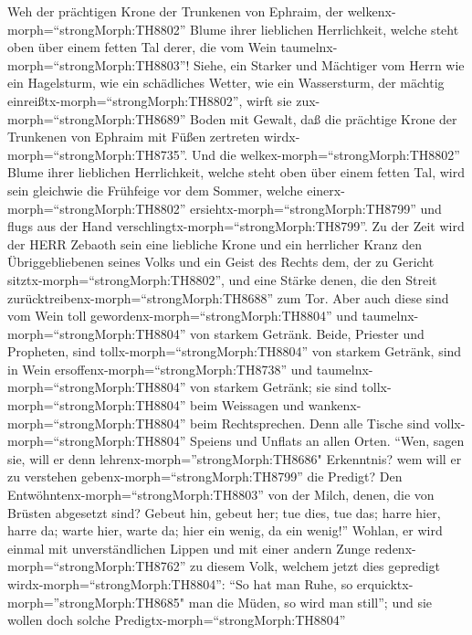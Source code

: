  Weh der prächtigen Krone der Trunkenen von Ephraim, der
welkenx-morph=``strongMorph:TH8802'' Blume ihrer lieblichen
Herrlichkeit, welche steht oben über einem fetten Tal derer, die vom
Wein taumelnx-morph=``strongMorph:TH8803''!  Siehe, ein
Starker und Mächtiger vom Herrn wie ein Hagelsturm, wie ein schädliches
Wetter, wie ein Wassersturm, der mächtig
einreißtx-morph=``strongMorph:TH8802'', wirft sie
zux-morph=``strongMorph:TH8689'' Boden mit Gewalt,  daß die
prächtige Krone der Trunkenen von Ephraim mit Füßen zertreten
wirdx-morph=``strongMorph:TH8735''.  Und die
welkex-morph=``strongMorph:TH8802'' Blume ihrer lieblichen Herrlichkeit,
welche steht oben über einem fetten Tal, wird sein gleichwie die
Frühfeige vor dem Sommer, welche einerx-morph=``strongMorph:TH8802''
ersiehtx-morph=``strongMorph:TH8799'' und flugs aus der Hand
verschlingtx-morph=``strongMorph:TH8799''.  Zu der Zeit wird
der HERR Zebaoth sein eine liebliche Krone und ein herrlicher Kranz den
Übriggebliebenen seines Volks  und ein Geist des Rechts dem,
der zu Gericht sitztx-morph=``strongMorph:TH8802'', und eine Stärke
denen, die den Streit zurücktreibenx-morph=``strongMorph:TH8688'' zum
Tor.  Aber auch diese sind vom Wein toll
gewordenx-morph=``strongMorph:TH8804'' und
taumelnx-morph=``strongMorph:TH8804'' von starkem Getränk. Beide,
Priester und Propheten, sind tollx-morph=``strongMorph:TH8804'' von
starkem Getränk, sind in Wein ersoffenx-morph=``strongMorph:TH8738'' und
taumelnx-morph=``strongMorph:TH8804'' von starkem Getränk; sie sind
tollx-morph=``strongMorph:TH8804'' beim Weissagen und
wankenx-morph=``strongMorph:TH8804'' beim Rechtsprechen. 
Denn alle Tische sind vollx-morph=``strongMorph:TH8804'' Speiens und
Unflats an allen Orten.  ``Wen, sagen sie, will er denn
lehrenx-morph=''strongMorph:TH8686" Erkenntnis? wem will er zu verstehen
gebenx-morph=``strongMorph:TH8799'' die Predigt? Den
Entwöhntenx-morph=``strongMorph:TH8803'' von der Milch, denen, die von
Brüsten abgesetzt sind?  Gebeut hin, gebeut her; tue dies,
tue das; harre hier, harre da; warte hier, warte da; hier ein wenig, da
ein wenig!''  Wohlan, er wird einmal mit unverständlichen
Lippen und mit einer andern Zunge redenx-morph=``strongMorph:TH8762'' zu
diesem Volk, welchem jetzt dies gepredigt
wirdx-morph=``strongMorph:TH8804'':  ``So hat man Ruhe, so
erquicktx-morph=''strongMorph:TH8685" man die Müden, so wird man
still''; und sie wollen doch solche
Predigtx-morph=``strongMorph:TH8804''
